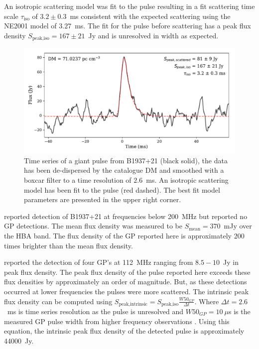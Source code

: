 \documentclass[RNAAS]{aastex62}
\begin{document}
An isotropic scattering model \citep{2017MNRAS.470.2659G} was fit to the pulse
resulting in a fit scattering time scale $\tau_{\textrm{iso}}$ of $3.2 \pm
0.3$~ms consistent with the expected scattering using the NE2001
\citep{2002astro.ph..7156C} model of $3.27$~ms. The fit for the pulse before
scattering has a peak flux density $S_{\textrm{peak,iso}} =167 \pm 21$~Jy and is
unresolved in width as expected.

\begin{figure}
	\centering
    \includegraphics[width=0.75\linewidth]{figures/B1937+21_pulse.pdf}
    \caption{Time series of a giant pulse from B1937+21 (black solid), the data
    has been de-dispersed by the catalogue DM and smoothed with a boxcar filter
    to a time resolution of $2.6$~ms. An isotropic scattering model has been fit
    to the pulse (red dashed). The best fit model parameters are presented in
    the upper right corner.
    }
    \label{fig:pulse}
\end{figure}

\cite{2016A&A...585A.128K} reported detection of B1937+21 at frequencies below
200~MHz but reported no GP detections. The mean flux density was measured to be
$S_{\textrm{mean}} = 370$~mJy over the HBA band. The flux density of the GP
reported here is approximately 200 times brighter than the mean flux density.

\cite{2002AstL...28...21K} reported the detection of four GP's at 112~MHz
ranging from $8.5 - 10$~Jy in peak flux density. The peak flux density of the
pulse reported here exceeds these flux densities by approximately an order of
magnitude. But, as these detections occurred at lower frequencies the pulses
were more scattered.  The intrinsic peak flux density can be computed using
$S_{\textrm{peak,intrinsic}} = S_{\textrm{peak,iso}} \frac{W50_{GP}}{\Delta t}$.
Where $\Delta t=2.6$~ms is time series resolution as the pulse is unresolved and
$W50_{GP} = 10~\mu$s is the measured GP pulse width from higher frequency
observations \citep{2000ApJ...535..365K}. Using this equation, the intrinsic
peak flux density of the detected pulse is approximately 44000~Jy.
\end{document}
